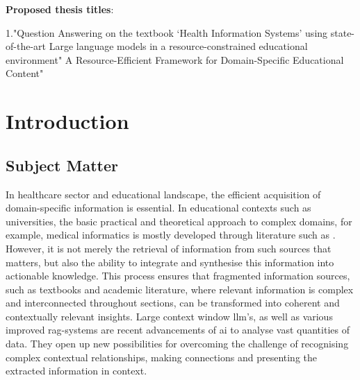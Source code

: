 \textbf{Proposed thesis titles}:

1."Question Answering on the textbook ‘Health Information Systems’ using state-of-the-art Large language models in a resource-constrained educational environment"
%
A Resource-Efficient Framework for Domain-Specific Educational Content"
\chapter{Introduction}\label{ch:introduction}
\section{Subject Matter}\label{sec:subject matter}
In healthcare sector and educational landscape, the efficient acquisition of domain-specific information is essential. 
In educational contexts such as universities, the basic practical and theoretical approach to complex domains, for example, medical informatics is mostly developed through literature such as \citet{bb2}.
However, it is not merely the retrieval of information from such sources that matters, but also the ability to integrate and synthesise this information into actionable knowledge.
This process ensures that fragmented information sources, such as textbooks and academic literature, where relevant information is complex and interconnected throughout sections, can be transformed into coherent and contextually relevant insights.
%
Large context window \ac{llm}'s, as well as various improved \ac{rag}-systems are recent advancements of \ac{ai} to analyse vast quantities of data.
They open up new possibilities for overcoming the challenge of recognising complex contextual relationships, making connections and presenting the extracted information in context.
%
